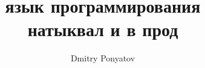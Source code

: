 
\title{язык программирования \T\\натыквал и в прод}
\author{Dmitry Ponyatov }

\maketitle
\tableofcontents





